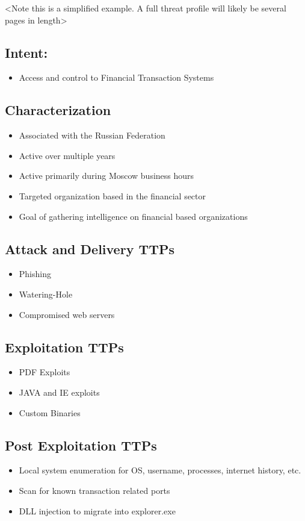 \documentclass[12pt,letterpaper]{article}
\begin{document}
<Note this is a simplified example. A full threat profile will likely be several pages in length>

\subsection{Intent:}
\begin{itemize}
    \item Access and control to Financial Transaction Systems
\end{itemize}

\subsection{Characterization}
\begin{itemize}
    \item Associated with the Russian Federation
    \item Active over multiple years
    \item Active primarily during Moscow business hours
    \item Targeted organization based in the financial sector
    \item Goal of gathering intelligence on financial based organizations
\end{itemize}

\subsection{Attack and Delivery TTPs}
\begin{itemize}
    \item Phishing
    \item Watering-Hole
    \item Compromised web servers
\end{itemize}

\subsection{Exploitation TTPs}
\begin{itemize}
    \item PDF Exploits
    \item JAVA and IE exploits
    \item Custom Binaries
\end{itemize}

\subsection{Post Exploitation TTPs}
\begin{itemize}
    \item Local system enumeration for OS, username, processes, internet history, etc.
    \item Scan for known transaction related ports
    \item DLL injection to migrate into explorer.exe
\end{itemize}
\end{document}
